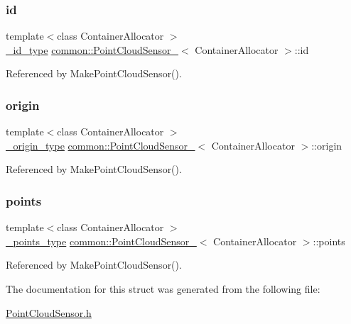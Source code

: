 \subsubsection{\texorpdfstring{id}{id}}
{\footnotesize\ttfamily template$<$class Container\+Allocator $>$ \\
\hyperlink{structcommon_1_1PointCloudSensor___a3fe5231127bdd91f0f9cc71c2b0c8bb9}{\+\_\+id\+\_\+type} \hyperlink{structcommon_1_1PointCloudSensor__}{common\+::\+Point\+Cloud\+Sensor\+\_\+}$<$ Container\+Allocator $>$\+::id}



Referenced by Make\+Point\+Cloud\+Sensor().

\mbox{\label{structcommon_1_1PointCloudSensor___a46c0d04864ae5accbea9e910f767b36a}} 
\subsubsection{\texorpdfstring{origin}{origin}}
{\footnotesize\ttfamily template$<$class Container\+Allocator $>$ \\
\hyperlink{structcommon_1_1PointCloudSensor___a68f3e06b319324c54ccf6930c76ce5a5}{\+\_\+origin\+\_\+type} \hyperlink{structcommon_1_1PointCloudSensor__}{common\+::\+Point\+Cloud\+Sensor\+\_\+}$<$ Container\+Allocator $>$\+::origin}



Referenced by Make\+Point\+Cloud\+Sensor().

\mbox{\label{structcommon_1_1PointCloudSensor___a9c071a8f3f3fef94250cea366002abac}} 
\subsubsection{\texorpdfstring{points}{points}}
{\footnotesize\ttfamily template$<$class Container\+Allocator $>$ \\
\hyperlink{structcommon_1_1PointCloudSensor___ad2bc50eca8da26178a900f86334007b5}{\+\_\+points\+\_\+type} \hyperlink{structcommon_1_1PointCloudSensor__}{common\+::\+Point\+Cloud\+Sensor\+\_\+}$<$ Container\+Allocator $>$\+::points}



Referenced by Make\+Point\+Cloud\+Sensor().



The documentation for this struct was generated from the following file\+:\begin{DoxyCompactItemize}
\item 
\hyperlink{PointCloudSensor_8h}{Point\+Cloud\+Sensor.\+h}\end{DoxyCompactItemize}
